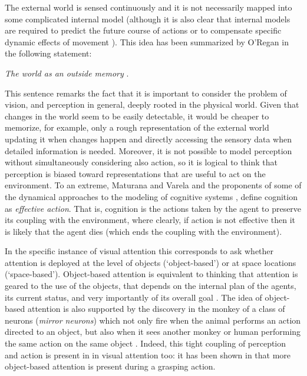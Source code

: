 \documentclass{llncs}
\begin{document}
The external world is sensed continuously and it is not necessarily 
mapped into some complicated internal model (although it is also clear
that internal models are required to predict the future course of
actions or to compensate specific dynamic effects of movement \cite{kawato-99}).
This idea has been summarized by O'Regan in the following statement:
\begin{center}
\emph{The world as an outside memory} \cite{ORegan92}.
\end{center}
This sentence remarks the fact that it is important
to consider the problem of vision, and perception in general,
deeply rooted in the physical world. Given that
changes in the world seem to be easily detectable, it
would be cheaper to memorize, for example, only a rough representation of
the external world updating it when changes happen and directly 
accessing the sensory data when detailed information is needed.
Moreover, it is not possible to model perception without
simultaneously considering also action, so it is logical to
think that perception is biased toward representations
that are useful to act on the environment.
To an extreme, Maturana and Varela \cite{maturana-varela-80} and the proponents of some of
the dynamical approaches to the modeling of cognitive systems \cite{vangelder-port-95},
define cognition as \emph{effective action}. That is, cognition is
the actions taken by the agent to preserve its coupling with the 
environment, where clearly, if action is not effective then it is likely
that the agent dies (which ends the coupling with the environment).

In the specific instance of visual attention this corresponds to ask
whether attention is deployed at the level of objects (`object-based') or
at space locations (`space-based').
Object-based attention is equivalent 
to thinking that attention is geared to the use of the objects,
that depends on the internal plan of the agents, its current status,
and very importantly of its overall goal \cite{craighero-99}. 
The idea of object-based attention is also supported by the discovery in the
monkey of a class of neurons (\emph{mirror neurons}) which not only
fire when the animal performs an action directed to an
object, but also when it sees another monkey or human performing the
same action on the same object \cite{FadigaFGR00}.
Indeed, this tight coupling of perception and action is present in
in visual attention too: it has been shown in \cite{FischerH04}
that more object-based attention is present during a grasping action.
\end{document}
